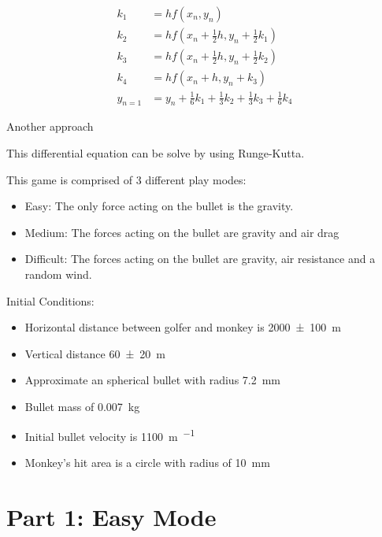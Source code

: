 \begin{align*}
    k_1 &= hf(x_n, y_n)\\
    k_2 &= hf(x_n + \frac{1}{2}h, y_n + \frac{1}{2}k_1)\\
    k_3 &= hf(x_n + \frac{1}{2}h, y_n + \frac{1}{2}k_2)\\
    k_4 &= hf(x_n + h,y_n + k_3)\\
    y_{n=1} &= y_n + \frac{1}{6}k_1 + \frac{1}{3}k_2 + \frac{1}{3}k_3 + \frac{1}{6}k_4
\end{align*}

Another approach

This differential equation can be solve by using Runge-Kutta. 


This game is comprised of 3 different play modes:

\begin{itemize}
    \item Easy: The only force acting on the bullet is the gravity.
    \item Medium: The forces acting on the bullet are gravity and air drag
    \item Difficult: The forces acting on the bullet are gravity, air resistance and a random wind.
\end{itemize}

Initial Conditions:
\begin{itemize}
    \item Horizontal distance between golfer and monkey is \SI{2000\pm 100}{\m}
    \item Vertical distance \SI{60 \pm 20}{\m}
    \item Approximate an spherical bullet with radius \SI{7.2}{\mm}
    \item Bullet mass of \SI{0.007}{\kilo\gram}
    \item Initial bullet velocity is \SI{1100}{\m\per\sec}
    \item Monkey's hit area is a circle with radius of \SI{10}{\mm}
\end{itemize}

\section*{Part 1: Easy Mode}
